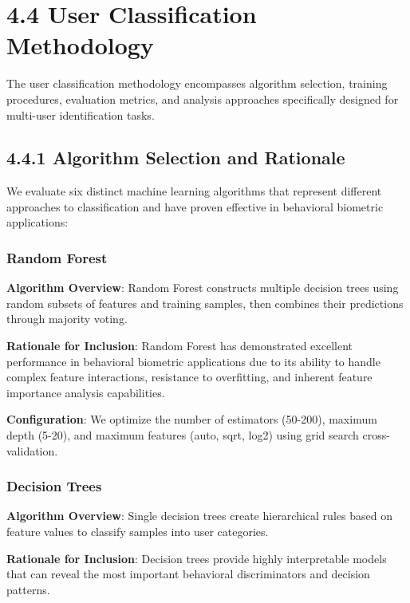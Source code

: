 \documentclass[
  12pt,
  a4paper,
]{report}
\begin{document}
\section{4.4 User Classification
Methodology}\label{user-classification-methodology}

The user classification methodology encompasses algorithm selection,
training procedures, evaluation metrics, and analysis approaches
specifically designed for multi-user identification tasks.

\subsection{4.4.1 Algorithm Selection and
Rationale}\label{algorithm-selection-and-rationale}

We evaluate six distinct machine learning algorithms that represent
different approaches to classification and have proven effective in
behavioral biometric applications:

\subsubsection{Random Forest}\label{random-forest}

\textbf{Algorithm Overview}: Random Forest constructs multiple decision
trees using random subsets of features and training samples, then
combines their predictions through majority voting.

\textbf{Rationale for Inclusion}: Random Forest has demonstrated
excellent performance in behavioral biometric applications due to its
ability to handle complex feature interactions, resistance to
overfitting, and inherent feature importance analysis capabilities.

\textbf{Configuration}: We optimize the number of estimators (50-200),
maximum depth (5-20), and maximum features (auto, sqrt, log2) using grid
search cross-validation.

\subsubsection{Decision Trees}\label{decision-trees}

\textbf{Algorithm Overview}: Single decision trees create hierarchical
rules based on feature values to classify samples into user categories.

\textbf{Rationale for Inclusion}: Decision trees provide highly
interpretable models that can reveal the most important behavioral
discriminators and decision patterns.
\end{document}
